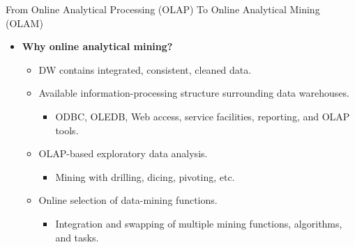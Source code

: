 \begin{frame}{From Online Analytical Processing (OLAP) To Online Analytical Mining (OLAM)}
	\begin{itemize}
		\item \textbf{Why online analytical mining?}
		      \begin{itemize}
			      \item DW contains integrated, consistent, cleaned data.
			      \item Available information-processing structure surrounding data warehouses.
			            \begin{itemize}
				            \item ODBC, OLEDB, Web access, service facilities, reporting, and OLAP tools.
			            \end{itemize}
			      \item OLAP-based exploratory data analysis.
			            \begin{itemize}
				            \item Mining with drilling, dicing, pivoting, etc.
			            \end{itemize}
			      \item Online selection of data-mining functions.
			            \begin{itemize}
				            \item Integration and swapping of multiple mining functions, algorithms, and tasks.
			            \end{itemize}
		      \end{itemize}
	\end{itemize}
\end{frame}
